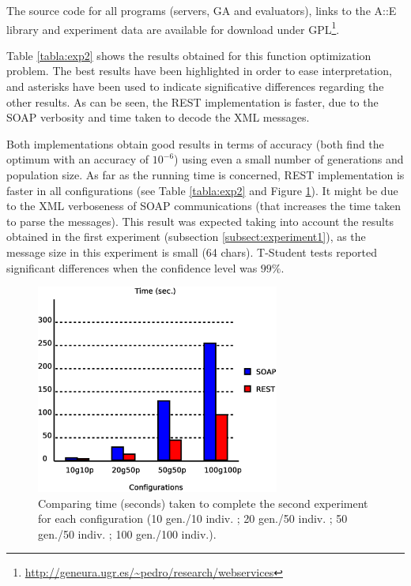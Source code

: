 \documentclass[final,1p,times]{elsarticle}
\begin{document}
The  source code for all programs (servers, GA and evaluators), links
to the A::E library and experiment data are available for download
under GPL\footnote{\url{http://geneura.ugr.es/~pedro/research/webservices}}. %

Table \ref{tabla:exp2} shows the results obtained for this function optimization problem.
The best results have been highlighted in order to ease interpretation, and asterisks have been used to indicate significative differences regarding the other results.
As can be seen, the REST implementation is faster, due to the SOAP verbosity and time taken to decode the XML messages.


Both implementations obtain good results in terms of accuracy (both find the optimum with an accuracy of $10^{-6}$) using even a small number of generations and population size. 
As far as the running time is concerned, REST implementation is faster in all configurations (see Table \ref{tabla:exp2} and Figure \ref{figure:exp2}). 
It might be due to the XML verboseness of SOAP communications (that increases the time taken to parse the messages).
This result was expected taking into account the results obtained in the first experiment (subsection \ref{subsect:experiment1}), as the message size in this experiment is small (64 chars). T-Student tests reported significant differences when the confidence level was $99\%$.

\begin{figure}[!ht]
\begin{center}
\includegraphics[width=8cm]{exp2.eps}
\caption{Comparing time (seconds) taken to complete the second experiment for each configuration (10 gen./10 indiv. ; 20 gen./50 indiv. ; 50 gen./50 indiv. ; 100 gen./100 indiv.). 
}
\label{figure:exp2}
\end{center}
\end{figure}
\end{document}
